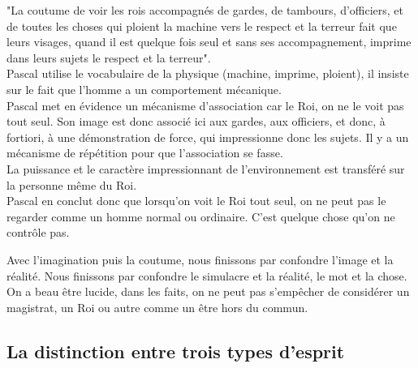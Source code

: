 \documentclass[10pt, a4paper, openany]{book}
\begin{document}
"La coutume de voir les rois accompagnés de gardes, de tambours, d'officiers, et de toutes les choses qui ploient la machine vers le respect et la terreur fait que leurs visages, quand il est quelque fois seul et sans ses accompagnement, imprime dans leurs sujets le respect et la terreur". \\
Pascal utilise le vocabulaire de la physique (machine, imprime, ploient), il insiste sur le fait que l'homme a un comportement mécanique. \\
Pascal met en évidence un mécanisme d'association car le Roi, on ne le voit pas tout seul. Son image est donc associé ici aux gardes, aux officiers, et donc, à fortiori, à une démonstration de force, qui impressionne donc les sujets. Il y a un mécanisme de répétition pour que l'association se fasse. \\
La puissance et le caractère impressionnant de l'environnement est transféré sur la personne même du Roi. \\
Pascal en conclut donc que lorsqu'on voit le Roi tout seul, on ne peut pas le regarder comme un homme normal ou ordinaire. C'est quelque chose qu'on ne contrôle pas.


Avec l'imagination puis la coutume, nous finissons par confondre l'image et la réalité. Nous finissons par confondre le simulacre et la réalité, le mot et la chose. \\
On a beau être lucide, dans les faits, on ne peut pas s'empêcher de considérer un magistrat, un Roi ou autre comme un être hors du commun. 

\subsection{La distinction entre trois types d'esprit}
\end{document}
